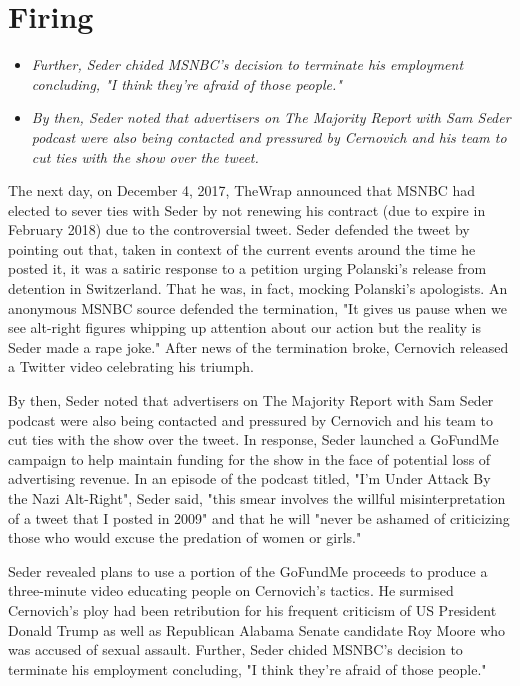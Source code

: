 \section{Firing}\label{firing}

\begin{itemize}
\item
  \emph{Further, Seder chided MSNBC's decision to terminate his
  employment concluding, "I think they're afraid of those people."}
\item
  \emph{By then, Seder noted that advertisers on The Majority Report
  with Sam Seder podcast were also being contacted and pressured by
  Cernovich and his team to cut ties with the show over the tweet.}
\end{itemize}

The next day, on December 4, 2017, TheWrap announced that MSNBC had
elected to sever ties with Seder by not renewing his contract (due to
expire in February 2018) due to the controversial tweet. Seder defended
the tweet by pointing out that, taken in context of the current events
around the time he posted it, it was a satiric response to a petition
urging Polanski's release from detention in Switzerland. That he was, in
fact, mocking Polanski's apologists. An anonymous MSNBC source defended
the termination, "It gives us pause when we see alt-right figures
whipping up attention about our action but the reality is Seder made a
rape joke." After news of the termination broke, Cernovich released a
Twitter video celebrating his triumph.

By then, Seder noted that advertisers on The Majority Report with Sam
Seder podcast were also being contacted and pressured by Cernovich and
his team to cut ties with the show over the tweet. In response, Seder
launched a GoFundMe campaign to help maintain funding for the show in
the face of potential loss of advertising revenue. In an episode of the
podcast titled, "I'm Under Attack By the Nazi Alt-Right", Seder said,
"this smear involves the willful misinterpretation of a tweet that I
posted in 2009" and that he will "never be ashamed of criticizing those
who would excuse the predation of women or girls."

Seder revealed plans to use a portion of the GoFundMe proceeds to
produce a three-minute video educating people on Cernovich's tactics. He
surmised Cernovich's ploy had been retribution for his frequent
criticism of US President Donald Trump as well as Republican Alabama
Senate candidate Roy Moore who was accused of sexual assault. Further,
Seder chided MSNBC's decision to terminate his employment concluding, "I
think they're afraid of those people."

